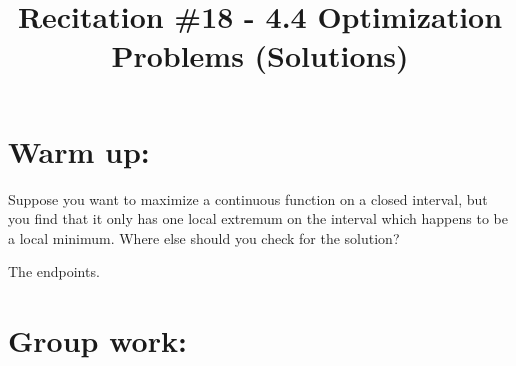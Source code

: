 \documentclass[nooutcomes]{ximera}
\title{Recitation \#18 - 4.4 Optimization Problems (Solutions)}
\begin{document}
\begin{abstract}		\end{abstract}
\maketitle

\section*{Warm up:} 
Suppose you want to maximize a continuous function on a closed interval, but you find that it only has one local extremum on the interval which happens to be a local minimum.  Where else should you check for the solution?    
		\begin{freeResponse}
		The endpoints.
		\end{freeResponse}	
		
		
		

	
	
	
	
	

\section*{Group work:}
\end{document}
